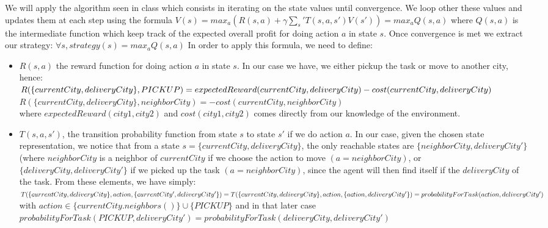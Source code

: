 \documentclass[11pt]{article}
\begin{document}
We will apply the algorithm seen in class which consists in iterating on the state values until convergence. We loop other these values and updates them at each step using the formula $V(s)=max_a{(R(s,a)+\gamma \sum_s'{T(s,a,s')V(s')})}=max_a{Q(s,a)}$ where $Q(s,a)$ is the intermediate function which keep track of the expected overall profit for doing action $a$ in state $s$. Once convergence is met we extract our strategy: $\forall s, strategy(s)=max_a{Q(s,a)}$
\newline
In order to apply this formula, we need to define:
\begin{itemize}
\item $R(s,a)$ the reward function for doing action $a$ in state $s$. In our case we have, we either pickup the task or move to another city, hence: \\
$R( \{currentCity,deliveryCity \},PICKUP) = expectedReward(currentCity,deliveryCity) \\ -cost(currentCity,deliveryCity)$ \\
$R( \{currentCity,deliveryCity \},neighborCity) = -cost(currentCity,neighborCity)$ \\
where $expectedReward(city1,city2)$ and $cost(city1,city2)$ comes directly from our knowledge of the environment.

\item $T(s,a,s')$, the transition probability function from state $s$ to state $s'$ if we do action $a$. In our case, given the chosen state representation, we notice that from a state $s= \{currentCity,deliveryCity \}$, the only reachable states are $\{neighborCity,deliveryCity'\}$ (where $neighborCity$ is a neighbor of $currentCity$ if we choose the action to move $(a=neighborCity)$, or $\{deliveryCity,deliveryCity'\}$ if we picked up the task $(a=neighborCity)$, since the agent will then find itself if the $deliveryCity$ of the task. \newline
From these elements, we have simply: \newline
$T(\{currentCity,deliveryCity\},action,\{currentCity',deliveryCity'\}) \\
=T(\{currentCity,deliveryCity\},action,\{action,deliveryCity'\}) \\ =probabilityForTask(action,deliveryCity')$
with $action \in \{currentCity.neighbors()\} \cup \{PICKUP\}$ and in that later case \\ $probabilityForTask(PICKUP,deliveryCity')=probabilityForTask(deliveryCity,deliveryCity')$
\end{itemize}
\end{document}
